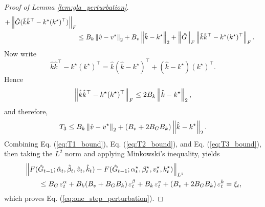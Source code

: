 \begin{proof}[Proof of Lemma \ref{lem:gla_perturbation}]
\begin{align}
+
\left\lVert \hat G(\hat k\hat k^\top-k^\star (k^\star)^\top) \right\rVert_F
\nonumber\\
&\le
B_k\left\lVert \hat v-v^\star \right\rVert_2
+
B_v\left\lVert \hat k-k^\star \right\rVert_2
+
\left\lVert \hat G \right\rVert_F \left\lVert \hat k\hat k^\top-k^\star (k^\star)^\top \right\rVert_F.
\label{eq:T3_three_terms}
\end{align}
Now write
\[
\hat k\hat k^\top-k^\star (k^\star)^\top
=
\hat k(\hat k-k^\star)^\top
+
(\hat k-k^\star)(k^\star)^\top.
\]
Hence
\begin{equation}
\left\lVert \hat k\hat k^\top-k^\star (k^\star)^\top \right\rVert_F
\le
2B_k \left\lVert \hat k-k^\star \right\rVert_2,
\label{eq:kk_bound}
\end{equation}
and therefore, 
\begin{equation}
T_3
\le
B_k \left\lVert \hat v-v^\star \right\rVert_2
+
(B_v+2B_GB_k)\left\lVert \hat k-k^\star \right\rVert_2.
\label{eq:T3_bound}
\end{equation}
Combining Eq. (\ref{eq:T1_bound}), Eq. (\ref{eq:T2_bound}), and Eq. (\ref{eq:T3_bound}), then taking the $L^2$ norm and applying Minkowski's inequality, yields
\begin{align}
&\left\lVert 
F(\hat G_{t-1};\hat\alpha_t,\hat\beta_t,\hat v_t,\hat k_t)
-
F(\hat G_{t-1};\alpha_t^\star,\beta_t^\star,v_t^\star,k_t^\star)
 \right\rVert_{L^2}
\nonumber\\
&\qquad\le
B_G\,\varepsilon_t^\alpha
+
B_k(B_v+B_GB_k)\,\varepsilon_t^\beta
+
B_k\,\varepsilon_t^v
+
(B_v+2B_GB_k)\,\varepsilon_t^k
=
\xi_t,
\end{align}
which proves Eq. (\ref{eq:one_step_perturbation}).
\end{proof}





























